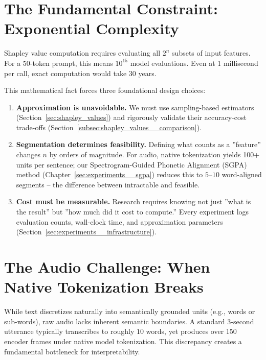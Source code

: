 \section{The Fundamental Constraint: Exponential Complexity}
\label{subsec:requirements__exponential}

Shapley value computation requires evaluating all $2^n$ subsets of input features. For a $50$-token prompt, this means $10^{15}$ model evaluations. Even at 1 millisecond per call, exact computation would take 30 years.

This mathematical fact forces three foundational design choices:

\begin{enumerate}[nosep]
    \item \textbf{Approximation is unavoidable.} We must use sampling-based estimators (Section~\ref{sec:shapley_values}) and rigorously validate their accuracy-cost trade-offs (Section~\ref{subsec:shapley_values__comparison}).

    \item \textbf{Segmentation determines feasibility.} Defining what counts as a ''feature'' changes $n$ by orders of magnitude. For audio, native tokenization yields 100+ units per sentence; our Spectrogram-Guided Phonetic Alignment (SGPA) method (Chapter~\ref{sec:experiments__sgpa}) reduces this to $5$--$10$ word-aligned segments -- the difference between intractable and feasible.

    \item \textbf{Cost must be measurable.} Research requires knowing not just ''what is the result'' but ''how much did it cost to compute.'' Every experiment logs evaluation counts, wall-clock time, and approximation parameters (Section~\ref{sec:experiments__infrastructure}).
\end{enumerate}

\section{The Audio Challenge: When Native Tokenization Breaks}
\label{subsec:requirements__audio}

While text discretizes naturally into semantically grounded units (e.g., words or sub-words), raw audio lacks inherent semantic boundaries. A standard $3$-second utterance typically transcribes to roughly $10$ words, yet produces over $150$ encoder frames under native model tokenization. This discrepancy creates a fundamental bottleneck for interpretability.

